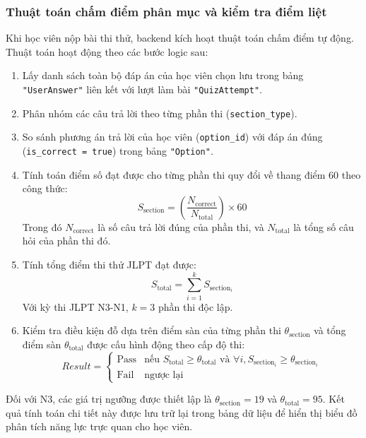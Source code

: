 \documentclass[../DoAn.tex]{subfiles}
\begin{document}
\subsubsection{Thuật toán chấm điểm phân mục và kiểm tra điểm liệt}
Khi học viên nộp bài thi thử, backend kích hoạt thuật toán chấm điểm tự động. Thuật toán hoạt động theo các bước logic sau:
\begin{enumerate}
    \item Lấy danh sách toàn bộ đáp án của học viên chọn lưu trong bảng \texttt{"UserAnswer"} liên kết với lượt làm bài \texttt{"QuizAttempt"}.
    \item Phân nhóm các câu trả lời theo từng phần thi (\texttt{section\_type}).
    \item So sánh phương án trả lời của học viên (\texttt{option\_id}) với đáp án đúng (\texttt{is\_correct = true}) trong bảng \texttt{"Option"}.
    \item Tính toán điểm số đạt được cho từng phần thi quy đổi về thang điểm 60 theo công thức:
    \begin{equation}
        S_{\text{section}} = \left( \frac{N_{\text{correct}}}{N_{\text{total}}} \right) \times 60
    \end{equation}
    Trong đó $N_{\text{correct}}$ là số câu trả lời đúng của phần thi, và $N_{\text{total}}$ là tổng số câu hỏi của phần thi đó.
    \item Tính tổng điểm thi thử JLPT đạt được:
    \begin{equation}
        S_{\text{total}} = \sum_{i=1}^{k} S_{\text{section}_{i}}
    \end{equation}
    Với kỳ thi JLPT N3-N1, $k = 3$ phần thi độc lập.
    \item Kiểm tra điều kiện đỗ dựa trên điểm sàn của từng phần thi $\theta_{\text{section}}$ và tổng điểm sàn $\theta_{\text{total}}$ được cấu hình động theo cấp độ thi:
    \begin{equation}
        Result = \begin{cases} 
          \text{Pass} & \text{nếu } S_{\text{total}} \ge \theta_{\text{total}} \text{ và } \forall i, S_{\text{section}_{i}} \ge \theta_{\text{section}_{i}} \\
          \text{Fail} & \text{ngược lại}
        \end{cases}
    \end{equation}
\end{enumerate}
Đối với N3, các giá trị ngưỡng được thiết lập là $\theta_{\text{section}} = 19$ và $\theta_{\text{total}} = 95$. Kết quả tính toán chi tiết này được lưu trữ lại trong bảng dữ liệu để hiển thị biểu đồ phân tích năng lực trực quan cho học viên.
\end{document}
